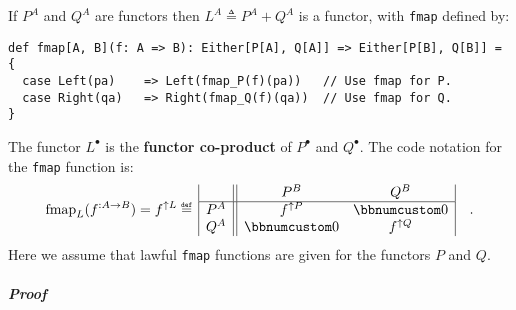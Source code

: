 If $P^{A}$ and $Q^{A}$ are functors then $L^{A}\triangleq P^{A}+Q^{A}$
is a functor, with \lstinline!fmap! defined by:
\begin{lstlisting}
def fmap[A, B](f: A => B): Either[P[A], Q[A]] => Either[P[B], Q[B]] = {
  case Left(pa)    => Left(fmap_P(f)(pa))   // Use fmap for P.
  case Right(qa)   => Right(fmap_Q(f)(qa))  // Use fmap for Q.
}
\end{lstlisting}
The functor $L^{\bullet}$ is the \textbf{functor co-product}
of $P^{\bullet}$ and $Q^{\bullet}$. The code notation for the \lstinline!fmap!
function is:
\[
\text{fmap}_{L}(f^{:A\rightarrow B})=f^{\uparrow L}\triangleq\,\begin{array}{|c||cc|}
 & P^{B} & Q^{B}\\
\hline P^{A} & f^{\uparrow P} & \bbnum 0\\
Q^{A} & \bbnum 0 & f^{\uparrow Q}
\end{array}\quad.
\]
Here we assume that lawful \lstinline!fmap! functions are given for
the functors $P$ and $Q$.

\subparagraph{Proof}


